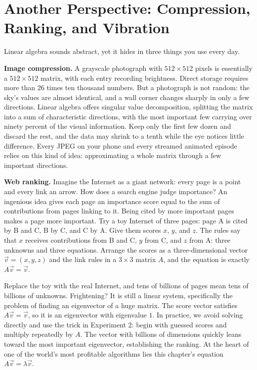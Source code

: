 \section{Another Perspective: Compression, Ranking, and Vibration}

Linear algebra sounds abstract, yet it hides in three things you use every day.

\textbf{Image compression.} A grayscale photograph with $512\times512$ pixels is essentially a $512\times512$ matrix, with each entry recording brightness. Direct storage requires more than $26$ times ten thousand numbers. But a photograph is not random: the sky's values are almost identical, and a wall corner changes sharply in only a few directions. Linear algebra offers singular value decomposition, splitting the matrix into a sum of characteristic directions, with the most important few carrying over ninety percent of the visual information. Keep only the first few dozen and discard the rest, and the data may shrink to a tenth while the eye notices little difference. Every JPEG on your phone and every streamed animated episode relies on this kind of idea: approximating a whole matrix through a few important directions.

\textbf{Web ranking.} Imagine the Internet as a giant network: every page is a point and every link an arrow. How does a search engine judge importance? An ingenious idea gives each page an importance score equal to the sum of contributions from pages linking to it. Being cited by more important pages makes a page more important. Try a toy Internet of three pages: page A is cited by B and C, B by C, and C by A. Give them scores $x$, $y$, and $z$. The rules say that $x$ receives contributions from B and C, $y$ from C, and $z$ from A: three unknowns and three equations. Arrange the scores as a three-dimensional vector $\vec{v}=(x,y,z)$ and the link rules in a $3\times3$ matrix $A$, and the equation is exactly $A\vec{v}=\vec{v}$.

Replace the toy with the real Internet, and tens of billions of pages mean tens of billions of unknowns. Frightening? It is still a linear system, specifically the problem of finding an eigenvector of a huge matrix. The score vector satisfies $A\vec{v}=\vec{v}$, so it is an eigenvector with eigenvalue $1$. In practice, we avoid solving directly and use the trick in Experiment 2: begin with guessed scores and multiply repeatedly by $A$. The vector with billions of dimensions quickly leans toward the most important eigenvector, establishing the ranking. At the heart of one of the world's most profitable algorithms lies this chapter's equation $A\vec{v}=\lambda\vec{v}$.

